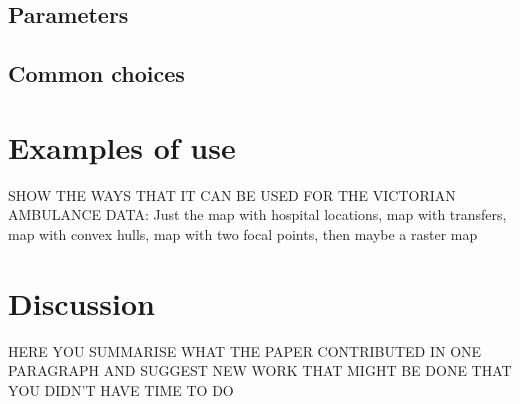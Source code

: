\subsection{Parameters}\label{parameters}

\subsection{Common choices}\label{common-choices}

\section{Examples of use}\label{examples-of-use}

SHOW THE WAYS THAT IT CAN BE USED FOR THE VICTORIAN AMBULANCE DATA: Just the map with hospital locations, map with transfers, map with convex hulls, map with two focal points, then maybe a raster map

\section{Discussion}\label{discussion}

HERE YOU SUMMARISE WHAT THE PAPER CONTRIBUTED IN ONE PARAGRAPH AND SUGGEST NEW WORK THAT MIGHT BE DONE THAT YOU DIDN'T HAVE TIME TO DO



\address{%
Thanh Cuong Nguyen\\
Monash University\\%
Department of Econometrics and Business Statistics\\ Melbourne, Australia\\
%
\url{https://alex-nguyen-vn.github.io}\\%
\textit{ORCiD: \href{https://orcid.org/0000-0000-0000-0000}{0000-0000-0000-0000}}\\%
\href{mailto:thanhcuong10091992@gmail.com}{\nolinkurl{thanhcuong10091992@gmail.com}}%
}

\address{%
Michael Lydeamore\\
Monash University\\%
Department of Econometrics and Business Statistics\\ Melbourne, Australia\\
%
\url{https://www.michaellydeamore.com}\\%
\textit{ORCiD: \href{https://orcid.org/0000-0001-6515-827X}{0000-0001-6515-827X}}\\%
\href{mailto:michael.lydeamore@monash.edu}{\nolinkurl{michael.lydeamore@monash.edu}}%
}

\address{%
Dianne Cook\\
Monash University\\%
Department of Econometrics and Business Statistics\\ Melbourne, Australia\\
%
\url{https://www.dicook.org}\\%
\textit{ORCiD: \href{https://orcid.org/0000-0002-3813-7155}{0000-0002-3813-7155}}\\%
\href{mailto:dicook@monash.edu}{\nolinkurl{dicook@monash.edu}}%
}
